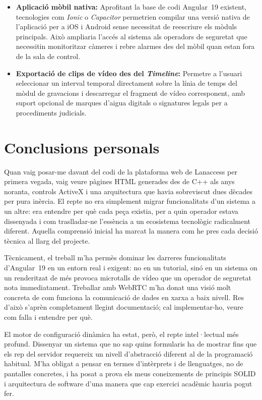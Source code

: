 \begin{itemize}
    \item \textbf{Aplicació mòbil nativa:} Aprofitant la base de codi Angular~19 existent, tecnologies com \textit{Ionic} o \textit{Capacitor} permetrien compilar una versió nativa de l'aplicació per a iOS i Android sense necessitat de reescriure els mòduls principals. Això ampliaria l'accés al sistema als operadors de seguretat que necessitin monitoritzar càmeres i rebre alarmes des del mòbil quan estan fora de la sala de control.

    \item \textbf{Exportació de clips de vídeo des del \textit{Timeline}:} Permetre a l'usuari seleccionar un interval temporal directament sobre la línia de temps del mòdul de gravacions i descarregar el fragment de vídeo corresponent, amb suport opcional de marques d'aigua digitals o signatures legals per a procediments judicials.
\end{itemize}

\section{Conclusions personals}

Quan vaig posar-me davant del codi de la plataforma web de Lanaccess per primera vegada, vaig veure pàgines HTML generades des de C++ als anys noranta, controls ActiveX i una arquitectura que havia sobreviscut dues dècades per pura inèrcia. El repte no era simplement migrar funcionalitats d'un sistema a un altre: era entendre per què cada peça existia, per a quin operador estava dissenyada i com traslladar-ne l'essència a un ecosistema tecnològic radicalment diferent. Aquella comprensió inicial ha marcat la manera com he pres cada decisió tècnica al llarg del projecte.

Tècnicament, el treball m'ha permès dominar les darreres funcionalitats d'Angular~19 en un entorn real i exigent: no en un tutorial, sinó en un sistema on un renderitzat de més provoca microtalls de vídeo que un operador de seguretat nota immediatament. Treballar amb WebRTC m'ha donat una visió molt concreta de com funciona la comunicació de dades en xarxa a baix nivell. Res d'això s'aprèn completament llegint documentació; cal implementar-ho, veure com falla i entendre per què.

El motor de configuració dinàmica ha estat, però, el repte intel·lectual més profund. Dissenyar un sistema que no sap quins formularis ha de mostrar fins que els rep del servidor requereix un nivell d'abstracció diferent al de la programació habitual. M'ha obligat a pensar en termes d'intèrprets i de llenguatges, no de pantalles concretes, i ha posat a prova els meus coneixements de principis SOLID i arquitectura de software d'una manera que cap exercici acadèmic hauria pogut fer.

